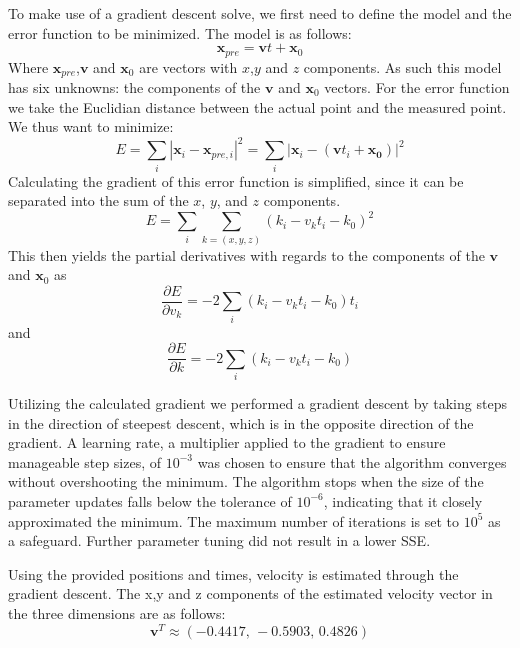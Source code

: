 \documentclass{article}
\begin{document}
\subsubsection{}
To make use of a gradient descent solve, we first need to define the model and the error function to be minimized. The model is as follows:
\begin{equation}
    \mathbf{x}_{pre} = \mathbf{v}t + \mathbf{x}_0
    \label{eq1}
\end{equation}
Where $\mathbf{x}_{pre}$,$\mathbf{v}$ and $\mathbf{x}_0$ are vectors with $x$,$y$ and $z$ components. As such this model has six unknowns: the components of the $\mathbf{v}$ and $\mathbf{x}_0$ vectors. For the error function we take the Euclidian distance between the actual point and the measured point. We thus want to minimize:
\begin{equation}
    E = \sum_i|\mathbf{x}_{i} -\mathbf{x}_{pre,i}|^2 = \sum_i|\mathbf{x}_i-(\mathbf{v}t_i+\mathbf{x_0})|^2
    \label{eq2}
\end{equation}
Calculating the gradient of this error function is simplified, since it can be separated into the sum of the $x$, $y$, and $z$ components. 
\begin{equation}
    E = \sum_i\sum_{k=(x,y,z)}(k_i - v_kt_i-k_0)^2
\end{equation}
This then yields the partial derivatives with regards to the components of the $\mathbf{v}$ and $\mathbf{x}_0$ as 
\begin{equation}
    \frac{\partial E}{\partial v_k} = -2\sum_i(k_i-v_kt_i-k_0)t_i
    \label{eq4}
\end{equation}
and
\begin{equation}
    \frac{\partial E}{\partial k} = -2\sum_i(k_i-v_kt_i-k_0)
    \label{eq5}
\end{equation}

Utilizing the calculated gradient we performed a gradient descent by taking steps in the direction of steepest descent, which is in the opposite direction of the gradient. A learning rate, a multiplier applied to the gradient to ensure manageable step sizes, of $10^{-3}$ was chosen to ensure that the algorithm converges without overshooting the minimum. The algorithm stops when the size of the parameter updates falls below the tolerance of $10^{-6}$, indicating that it closely approximated the minimum. The maximum number of iterations is set to $10^{5}$ as a safeguard. Further parameter tuning did not result in a lower SSE.

Using the provided positions and times, velocity is estimated through the gradient descent. The x,y and z components of the estimated velocity vector in the three dimensions are as follows:
\begin{equation}
\mathbf{v}^T \approx (-0.4417,\,-0.5903,\,0.4826)
\end{equation}
\end{document}
